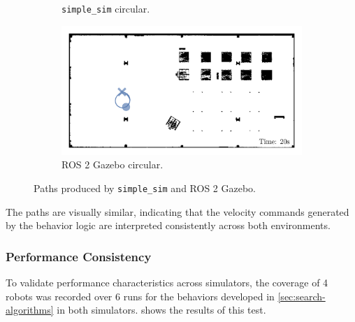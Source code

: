 \begin{figure}[H]
\begin{subfigure}[b]{0.45\textwidth}
    \caption{\texttt{simple\_sim} circular.}
  \end{subfigure}
  \begin{subfigure}[b]{0.45\textwidth}
    \centering
    \includegraphics[width=\textwidth]{./figures/plots/consistency/ros-2-paths-circle.png}
    \caption{ROS 2 Gazebo circular.}
  \end{subfigure}
  \caption{Paths produced by \texttt{simple\_sim} and ROS 2 Gazebo.}
  \label{fig:movement-consistency}
\end{figure}

The paths are visually similar, indicating that the velocity commands generated by the behavior logic are interpreted consistently across both environments.

\subsubsection{Performance Consistency}
To validate performance characteristics across simulators, the coverage of 4 robots was recorded over 6 runs for the behaviors developed in \cref{sec:search-algorithms} in both simulators.  shows the results of this test.

